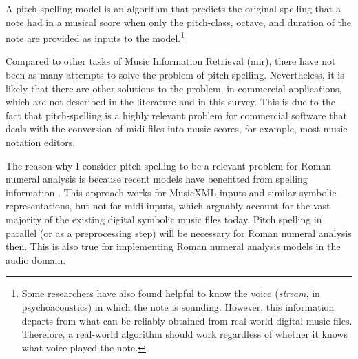 

A pitch-spelling model is an algorithm that predicts the
original spelling that a note had in a musical score when
only the pitch-class, octave, and duration of the note are
provided as inputs to the model.\footnote{Some researchers
have also found helpful to know the voice (\emph{stream}, in
psychoacoustics) in which the note is sounding. However,
this information departs from what can be reliably obtained
from real-world digital music files. Therefore, a real-world
algorithm should work regardless of whether it knows what
voice played the note.}


Compared to other tasks of Music Information Retrieval
(\gls{mir}), there have not been as many attempts to solve the
problem of pitch spelling. Nevertheless, it is likely that
there are other solutions to the problem, in commercial
applications, which are not described in the literature and
in this survey. This is due to the fact that pitch-spelling
is a highly relevant problem for commercial software that
deals with the conversion of \gls{midi} files into music scores,
for example, most music notation editors.

The reason why I consider pitch spelling to be a relevant problem for Roman numeral analysis is because recent models have benefitted from spelling information \parencite{micchi2020not}. This approach works for MusicXML inputs and similar symbolic representations, but not for \gls{midi} inputs, which arguably account for the vast majority of the existing digital symbolic music files today. Pitch spelling in parallel (or as a preprocessing step) will be necessary for Roman numeral analysis then. This is also true for implementing Roman numeral analysis models in the audio domain.
